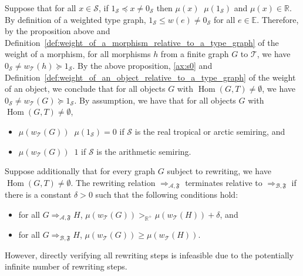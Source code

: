     Suppose that for all $x \mathop{\in} \mathcal{S}$, if $ 1_\mathcal{S} \mathop{\preceq} x \mathop{\neq} 0_\mathcal{S}$ then $\mu(x) \mathop{\geq_{\mathbb{R}^+}} \mu(1_\mathcal{S})$ and $\mu(x) \mathop{\in} \mathbb{R}$. 
    By definition of a weighted type graph, $1_\mathcal{S} \leq w(e)\mathop{\neq} 0_\mathcal{S}$ for all $e\in\mathbb{E}$.
    Therefore, by the proposition above and Definition~\ref{def:weight_of_a_morphism_relative_to_a_type_graph} of the weight of a morphism, for all morphisms \( h \) from a finite graph $G$ to $\mathcal{T}$, we have \( 0_\mathcal{S} \mathop{\neq} w_\mathcal{T}(h) \mathop{\succeq} 1_\mathcal{S} \). 
    By the above proposition, \eqref{ax:s0} and Definition~\ref{def:weight_of_an_object_relative_to_a_type_graph} of the weight of an object, we conclude that for all objects \( G \) with $\operatorname{Hom}(G,T)\mathop{\neq} \emptyset$, we have \( 0_\mathcal{S} \mathop{\neq} w_\mathcal{T}(G) \mathop{\succeq} 1_\mathcal{S} \). By assumption, we have that for all objects \( G \) with $\operatorname{Hom}(G,T)\mathop{\neq} \emptyset$, 
    \begin{itemize}
       \item \( \mu(w_\mathcal{T}(G)) \mathop{\geq_{\mathbb{R}^+}} \mu(1_\mathcal{S}) \mathop{=} 0 \) if $\mathcal{S}$ is the real tropical or arctic semiring, and
       \item \( \mu(w_\mathcal{T}(G)) \mathop{\geq_{\mathbb{R}^+}} 1 \) if $\mathcal{S}$ is the arithmetic semiring.
    \end{itemize} 

Suppose additionally that for every graph $G$ subject to rewriting, we have $\operatorname{Hom}(G,T)\mathop{\neq} \emptyset$. The rewriting relation \( \mathop{\Rightarrow}_{\mathcal{A},\mathfrak{F}} \) terminates relative to $\mathop{\Rightarrow}_{\mathcal{B},\mathfrak{F}}$ if there is a constant $\delta \mathop{>} 0$ such that the following conditions hold:
\begin{itemize}
   \item  for all \(G \mathop{\Rightarrow}_{\mathcal{A},\mathfrak{F}} H\), \( \mu(w_\mathcal{T}(G)) >_{\mathbb{R}^+} \mu(w_\mathcal{T}(H))\mathop{+}\delta \), and
   \item for all \(G \mathop{\Rightarrow}_{\mathcal{B},\mathfrak{F}} H\), \( \mu(w_\mathcal{T}(G)) \mathop{\geq} \mu(w_\mathcal{T}(H)) \).
\end{itemize}
 However, directly verifying all rewriting steps is infeasible due to the potentially infinite number of rewriting steps.


